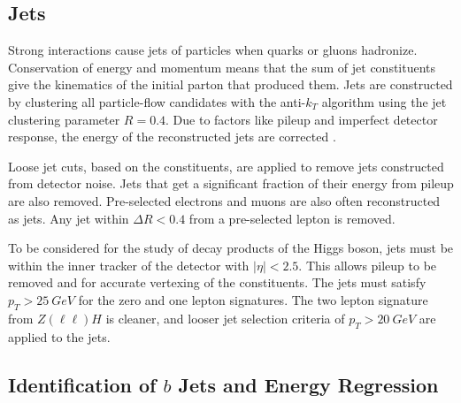 \subsection{Jets} \label{sec:jets-def}

Strong interactions cause jets of particles when quarks or gluons hadronize.
Conservation of energy and momentum means that the sum of jet constituents
give the kinematics of the initial parton that produced them.
Jets are constructed by clustering all particle-flow candidates
with the anti-$k_T$ algorithm \cite{Cacciari_2008}
using the jet clustering parameter $R = 0.4$.
Due to factors like pileup and imperfect detector response,
the energy of the reconstructed jets are corrected \cite{Khachatryan_2017}.

Loose jet cuts, based on the constituents,
are applied to remove jets constructed from detector noise.
Jets that get a significant fraction of their energy from pileup are also removed.
Pre-selected electrons and muons are also often reconstructed as jets.
Any jet within $\Delta R < 0.4$ from a pre-selected lepton is removed.

To be considered for the study of decay products of the Higgs boson,
jets must be within the inner tracker of the detector with $|\eta| < 2.5$.
This allows pileup to be removed and for accurate vertexing of the constituents.
The jets must satisfy $p_T > \SI{25}{GeV}$ for the zero and one lepton signatures.
The two lepton signature from $Z(\ell\ell)H$ is cleaner,
and looser jet selection criteria of $p_T > \SI{20}{GeV}$ are applied to the jets.

\subsection{Identification of $b$ Jets and Energy Regression}

